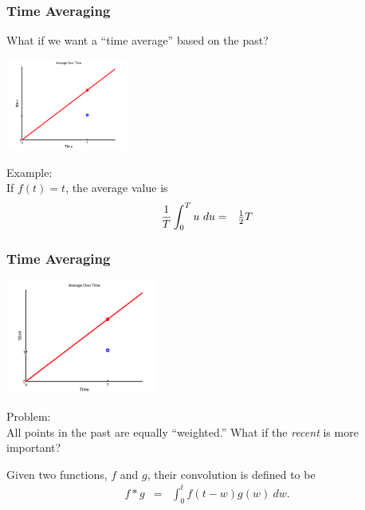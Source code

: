 \begin{frame}
  \frametitle{Time Averaging}

  \vspace*{-1em}
  What if we want a ``time average'' based on the past? \\
  \centerline{\includegraphics[width=4cm]{img/linearAverage}}

  Example: \\
  If $f(t)=t$, the average value is 
  \begin{eqnarray*}
    \frac{1}{T} \int^T_0 u ~ du & = & \mbox{$\frac{1}{2}$} T
  \end{eqnarray*}

\end{frame}


\begin{frame}
  \frametitle{Time Averaging}

  \centerline{\includegraphics[width=5cm]{img/linearAverage}}

  Problem: \\
  All points in the past are equally ``weighted.'' What if the
  \textit{recent} is more important?

\end{frame}


\begin{frame}
  \begin{definition}
    Given two functions, $f$ and $g$, their convolution is defined to be
    \begin{eqnarray*}
      f*g & = & \int^t_0 f(t-w) g(w) ~ dw.
    \end{eqnarray*}
  \end{definition}
\end{frame}

